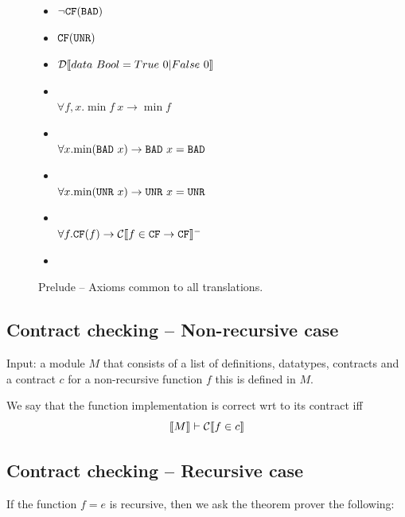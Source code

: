 \documentclass[preprint]{sigplanconf}
\begin{document}
\begin{figure}\label{fig:prelude}
  \begin{itemize}
    \item $\lnot \texttt{CF}(\texttt{BAD})$
    \item $\texttt{CF}(\texttt{UNR})$
    \item $\mathcal{D} \llbracket data~Bool = True~0 | False~0 \rrbracket$
    \item \designChoice\\ $\forall f,x. \min{f ~x} \to \min{f}$
    \item \designChoice\\ $\forall x. \mbox{min}(\texttt{BAD} ~x) \to \texttt{BAD} ~x = \texttt{BAD}$ 
    \item \designChoice\\ $\forall x. \mbox{min}(\texttt{UNR} ~x) \to \texttt{UNR} ~x = \texttt{UNR}$
    \item \designChoice\\ $\forall f. \texttt{CF}(f) \to \mathcal{C} \llbracket f \in \texttt{CF} \to \texttt{CF} \rrbracket^-$
    \item 
  \end{itemize}
  \caption{Prelude -- Axioms common to all translations.}
\end{figure}

\subsection{Contract checking -- Non-recursive case}
Input: a module $M$ that consists of a list of definitions, datatypes,
contracts and a contract $c$ for a non-recursive function $f$ this is
defined in $M$.

We say that the function implementation is correct wrt to its contract
iff $$\llbracket M \rrbracket \vdash \mathcal{C} \llbracket f \in c \rrbracket$$

\subsection{Contract checking -- Recursive case}\label{sec:recursiveContracts}
If the function $f=e$ is recursive, then we ask the theorem prover the
following:
\end{document}
